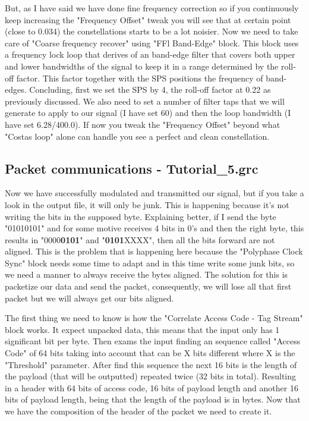 \documentclass[a4paper, 10pt, conference]{ieeeconf}      %
\begin{document}
    But, as I have said we have done fine frequency correction so if you continuously keep increasing the "Frequency Offset" tweak you will see that at certain point (close to 0.034) the constellations starts to be a lot noisier. Now we need to take care of "Coarse frequency recover" using "FFl Band-Edge" block. This block uses a frequency lock loop that derives of an band-edge filter that covers both upper and lower bandwidths of the signal to keep it in a range determined by the roll-off factor. This factor together with the SPS positions the frequency of band-edges.
    Concluding, first we set the SPS by 4, the roll-off factor at 0.22 as previously discussed. We also need to set a number of filter taps that we will generate to apply to our signal (I have set 60) and then the loop bandwidth (I have set 6.28/400.0). If now you tweak the "Frequency Offset" beyond what "Costas loop" alone can handle you see a perfect and clean constellation. 

\subsection{Packet communications - Tutorial\_5.grc}
    Now we have successfully modulated and transmitted our signal, but if you take a look in the output file, it will only be junk. This is happening because it's not writing the bits in the supposed byte. Explaining better, if I send the byte "01010101" and for some motive receives 4 bits in 0's and then the right byte, this results in "0000\textbf{0101}" and "\textbf{0101}XXXX", then all the bits forward are not aligned. This is the problem that is happening here because the "Polyphase Clock Sync" block needs some time to adapt and in this time write some junk bits, so we need a manner to always receive the bytes aligned. The solution for this is packetize our data and send the packet, consequently, we will lose all that first packet but we will always get our bits aligned.
    
    The first thing we need to know is how the "Correlate Access Code - Tag Stream" block works. It expect unpacked data, this means that the input only has 1 significant bit per byte. Then exams the input finding an sequence called "Access Code" of 64 bits taking into account that can be X bits different where X is the "Threshold" parameter. After find this sequence the next 16 bits is the length of the payload (that will be outputted) repeated twice (32 bits in total). Resulting in a header with 64 bits of access code, 16 bits of payload length and another 16 bits of payload length, being that the length of the payload is in bytes. Now that we have the composition of the header of the packet we need to create it.
    
\end{document}
